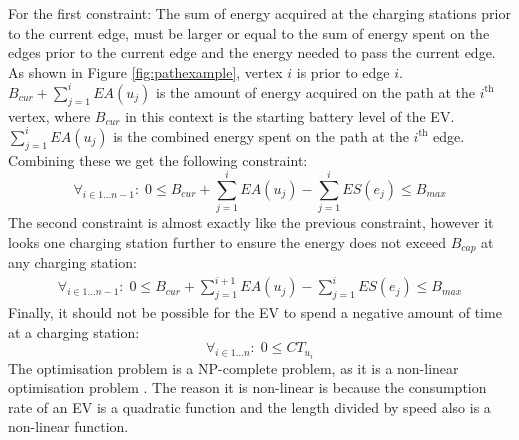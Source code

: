 For the first constraint: The sum of energy acquired at the charging stations prior to the current edge, must be larger or equal to the sum of energy spent on the edges prior to the current edge and the energy needed to pass the current edge. As shown in Figure \ref{fig:pathexample}, vertex $i$ is prior to edge $i$. $B_{cur} + \sum_{j=1}^{i} EA(u_j)$ is the amount of energy acquired on the path at the $i^{\text{th}}$ vertex, where $B_{cur}$ in this context is the starting battery level of the EV. $\sum_{j=1}^{i} EA(u_j)$ is the combined energy spent on the path at the $i^{\text{th}}$ edge. Combining these we get the following constraint:
\begin{equation*}
\forall_{i\in1 \dots n-1 }:\;0 \leq B_{cur} + \sum_{j=1}^{i} EA(u_j) - \sum_{j=1}^{i} ES(e_j) \leq B_{max}
\end{equation*}
The second constraint is almost exactly like the previous constraint, however it looks one charging station further to ensure the energy does not exceed $B_{cap}$ at any charging station:
\begin{equation*}
\begin{aligned}
\forall_{i\in1 \dots n-1}:\;0 \leq B_{cur} + \sum_{j=1}^{i+1} EA(u_j) - \sum_{j=1}^{i} ES(e_j) \leq B_{max}
\end{aligned}
\end{equation*}
Finally, it should not be possible for the EV to spend a negative amount of time at a charging station:
\begin{equation*}
\forall_{i\in1 \dots n }:\; 0 \leq CT_{u_i}
\end{equation*}
The optimisation problem is a NP-complete problem, as it is a non-linear optimisation problem \cite{Murty1987}. The reason it is non-linear is because
the consumption rate of an EV is a quadratic function and the length divided by speed also is a non-linear function.
